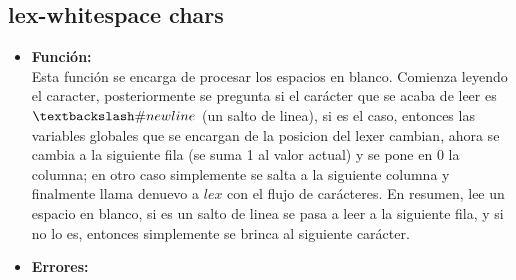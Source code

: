 \documentclass{article}
\begin{document}
\subsection{lex-whitespace chars}
\begin{itemize}
    \item \textbf{Función:} \\
    Esta función se encarga de procesar los espacios en blanco. Comienza leyendo el caracter, posteriormente se pregunta si el carácter que se acaba de leer es $\textbackslash\# newline$ (un salto de linea), si es el caso, entonces las variables globales que se encargan de la posicion del lexer cambian, ahora se cambia a la siguiente fila (se suma 1 al valor actual) y se pone en 0 la columna; en otro  caso simplemente se salta a la siguiente columna y finalmente llama denuevo a $lex$ con el flujo de carácteres. En resumen, lee un espacio en blanco, si es un salto de linea se pasa a leer a la siguiente fila, y si no lo es, entonces simplemente se brinca al siguiente carácter.
    \item \textbf{Errores:} \\ 
\end{itemize}
\end{document}
